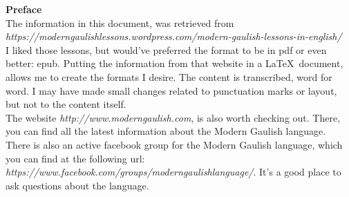 \begin{center}
\textbf{Preface}\\
\bigskip
\noindent The information in this document, was retrieved from \textit{https://moderngaulishlessons.wordpress.com/modern-gaulish-lessons-in-english/}\\
\bigskip
\noindent I liked those lessons, but would've preferred the format to be in pdf or even better: epub. Putting the information from that website in a \LaTeX\ document, allows me to create the formats I desire. The content is transcribed, word for word. I may have made small changes related to punctuation marks or layout, but not to the content itself.\\
\bigskip
\noindent The website \textit{http://www.moderngaulish.com}, is also worth checking out. There, you can find all the latest information about the Modern Gaulish language.\\
\bigskip
\noindent There is also an active facebook group for the Modern Gaulish language, which you can find at the following url: \textit{https://www.facebook.com/groups/moderngaulishlanguage/}. It's a good place to ask questions about the language.
\end{center}
